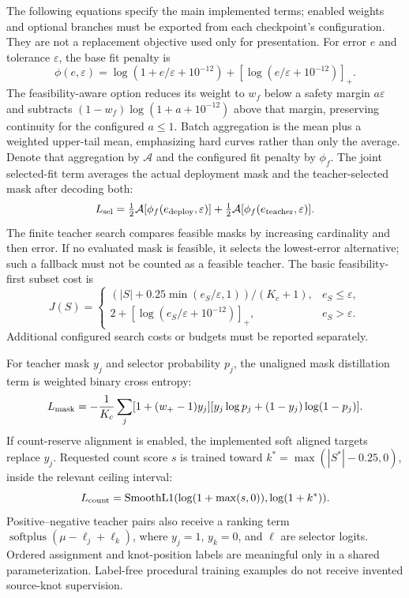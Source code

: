 The following equations specify the main implemented terms; enabled weights
and optional branches must be exported from each checkpoint's configuration.
They are not a replacement objective used only for presentation.
For error $e$ and tolerance $\varepsilon$, the base fit penalty is
\begin{equation}
 \phi(e,\varepsilon)=\log(1+e/\varepsilon+10^{-12})
 +[\log(e/\varepsilon+10^{-12})]_+.
\end{equation}
The feasibility-aware option reduces its weight to $w_f$ below a safety
margin $a\varepsilon$ and subtracts $(1-w_f)\log(1+a+10^{-12})$
above that margin, preserving continuity for the configured $a\leq1$.
Batch aggregation is the mean plus a weighted upper-tail mean, emphasizing
hard curves rather than only the average. Denote that aggregation by
$\mathcal A$ and the configured fit penalty by $\phi_f$.
The joint selected-fit term averages the actual deployment mask and the
teacher-selected mask after decoding both:
\begin{equation}
 L_{\rm sel}=\tfrac12\mathcal A[\phi_f(e_{\rm deploy},\varepsilon)]
             +\tfrac12\mathcal A[\phi_f(e_{\rm teacher},\varepsilon)].
\end{equation}
The finite teacher search compares feasible masks by increasing cardinality
and then error. If no evaluated mask is feasible, it selects the lowest-error
alternative; such a fallback must not be counted as a feasible teacher.
The basic feasibility-first subset cost is
\begin{equation}
 J(S)=\begin{cases}
 (|S|+0.25\min(e_S/\varepsilon,1))/(K_c+1),&e_S\leq\varepsilon,\\
 2+[\log(e_S/\varepsilon+10^{-12})]_+,&e_S>\varepsilon.
 \end{cases}
\end{equation}
Additional configured search costs or budgets must be reported separately.

For teacher mask $y_j$ and selector probability $p_j$, the unaligned mask
distillation term is weighted binary cross entropy:
\begin{equation}
 L_{\rm mask}=-\frac1{K_c}\sum_j[1+(w_+-1)y_j]
 [y_j\log p_j+(1-y_j)\log(1-p_j)].
\end{equation}
If count-reserve alignment is enabled, the implemented soft aligned targets
replace $y_j$. Requested count score $s$ is trained toward
$k^*=\max(|S^*|-0.25,0)$, inside the relevant ceiling interval:
\begin{equation}
 L_{\rm count}=\operatorname{SmoothL1}(\log(1+\max(s,0)),\log(1+k^*)).
\end{equation}
Positive--negative teacher pairs also receive a ranking term
$\operatorname{softplus}(\mu-\ell_j+\ell_k)$, where $y_j=1$, $y_k=0$,
and $\ell$ are selector logits. Ordered assignment and knot-position labels
are meaningful only in a shared parameterization. Label-free procedural
training examples do not receive invented source-knot supervision.

